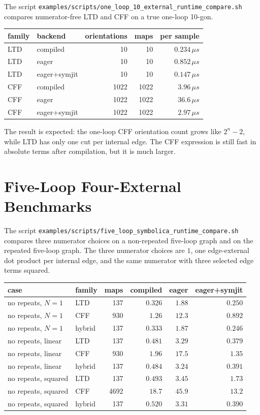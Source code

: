 \documentclass[11pt,a4paper]{report}
\begin{document}
The script
\texttt{examples/scripts/one\_loop\_10\_external\_runtime\_compare.sh}
compares numerator-free LTD and CFF on a true one-loop 10-gon.

\begin{center}
\begin{tabular}{llrrr}
\toprule
family & backend & orientations & maps & per sample \\
\midrule
LTD & compiled & 10 & 10 & \(0.234\,\mu s\) \\
LTD & eager & 10 & 10 & \(0.852\,\mu s\) \\
LTD & eager+symjit & 10 & 10 & \(0.147\,\mu s\) \\
CFF & compiled & 1022 & 1022 & \(3.96\,\mu s\) \\
CFF & eager & 1022 & 1022 & \(36.6\,\mu s\) \\
CFF & eager+symjit & 1022 & 1022 & \(2.97\,\mu s\) \\
\bottomrule
\end{tabular}
\end{center}

The result is expected: the one-loop CFF orientation count grows like
\(2^n-2\), while LTD has only one cut per internal edge.  The CFF expression is
still fast in absolute terms after compilation, but it is much larger.

\section{Five-Loop Four-External Benchmarks}

The script
\texttt{examples/scripts/five\_loop\_symbolica\_runtime\_compare.sh} compares
three numerator choices on a non-repeated five-loop graph and on the repeated
five-loop graph.  The three numerator choices are \(1\), one edge-external dot
product per internal edge, and the same numerator with three selected edge
terms squared.

\begin{center}
\begin{tabular}{llrrrr}
\toprule
case & family & maps & compiled & eager & eager+symjit \\
\midrule
no repeats, \(N=1\) & LTD & 137 & \(0.326\) & \(1.88\) & \(0.250\) \\
no repeats, \(N=1\) & CFF & 930 & \(1.26\) & \(12.3\) & \(0.892\) \\
no repeats, \(N=1\) & hybrid & 137 & \(0.333\) & \(1.87\) & \(0.246\) \\
no repeats, linear & LTD & 137 & \(0.481\) & \(3.29\) & \(0.379\) \\
no repeats, linear & CFF & 930 & \(1.96\) & \(17.5\) & \(1.35\) \\
no repeats, linear & hybrid & 137 & \(0.484\) & \(3.24\) & \(0.391\) \\
no repeats, squared & LTD & 137 & \(0.493\) & \(3.45\) & \(1.73\) \\
no repeats, squared & CFF & 4692 & \(18.7\) & \(45.9\) & \(13.2\) \\
no repeats, squared & hybrid & 137 & \(0.520\) & \(3.31\) & \(0.390\) \\
\bottomrule
\end{tabular}
\end{center}
\end{document}
